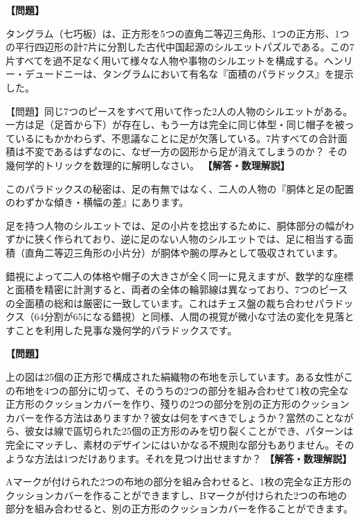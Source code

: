 \documentclass[10pt,a4paper,oneside,openany]{ltjsbook}
\begin{document}
\begin{tcolorbox}[colback=softblue,colframe=primaryblue,title=\textbf{第 169 問：タングラムのパラドックス（消える足の謎） （原題: A TANGRAM PARADOX.）},arc=2mm,boxrule=1pt,breakable]
\textbf{【問題】}\par\vspace{0.3em}
タングラム（七巧板）は、正方形を5つの直角二等辺三角形、1つの正方形、1つの平行四辺形の計7片に分割した古代中国起源のシルエットパズルである。この7片すべてを過不足なく用いて様々な人物や事物のシルエットを構成する。ヘンリー・デュードニーは、タングラムにおいて有名な『面積のパラドックス』を提示した。

【問題】同じ7つのピースをすべて用いて作った2人の人物のシルエットがある。一方は足（足首から下）が存在し、もう一方は完全に同じ体型・同じ帽子を被っているにもかかわらず、不思議なことに足が欠落している。7片すべての合計面積は不変であるはずなのに、なぜ一方の図形から足が消えてしまうのか？ その幾何学的トリックを数理的に解明しなさい。
\tcblower
\textbf{【解答・数理解説】}\par\vspace{0.3em}
このパラドックスの秘密は、足の有無ではなく、二人の人物の『胴体と足の配置のわずかな傾き・横幅の差』にあります。

足を持つ人物のシルエットでは、足の小片を捻出するために、胴体部分の幅がわずかに狭く作られており、逆に足のない人物のシルエットでは、足に相当する面積（直角二等辺三角形の小片分）が胴体や腕の厚みとして吸収されています。

錯視によって二人の体格や帽子の大きさが全く同一に見えますが、数学的な座標と面積を精密に計測すると、両者の全体の輪郭線は異なっており、7つのピースの全面積の総和は厳密に一致しています。これはチェス盤の裁ち合わせパラドックス（64分割が65になる錯視）と同様、人間の視覚が微小な寸法の変化を見落とすことを利用した見事な幾何学的パラドックスです。
\end{tcolorbox}

\begin{tcolorbox}[colback=softblue,colframe=primaryblue,title=\textbf{第 170 問：Cushion Covers の切り方 （原題: THE CUSHION COVERS.）},arc=2mm,boxrule=1pt,breakable]
\textbf{【問題】}\par\vspace{0.3em}
上の図は25個の正方形で構成された絹織物の布地を示しています。ある女性がこの布地を4つの部分に切って、そのうちの2つの部分を組み合わせて1枚の完全な正方形のクッションカバーを作り、殘りの2つの部分を別の正方形のクッションカバーを作る方法はありますか？彼女は何をすべきでしょうか？當然のことながら、彼女は線で區切られた25個の正方形のみを切り裂くことができ、パターンは完全にマッチし、素材のデザインにはいかなる不規則な部分もありません。そのような方法は1つだけあります。それを見つけ出せますか？
\tcblower
\textbf{【解答・数理解説】}\par\vspace{0.3em}
Aマークが付けられた2つの布地の部分を組み合わせると、1枚の完全な正方形のクッションカバーを作ることができますし、Bマークが付けられた2つの布地の部分を組み合わせると、別の正方形のクッションカバーを作ることができます。
\end{tcolorbox}
\end{document}

